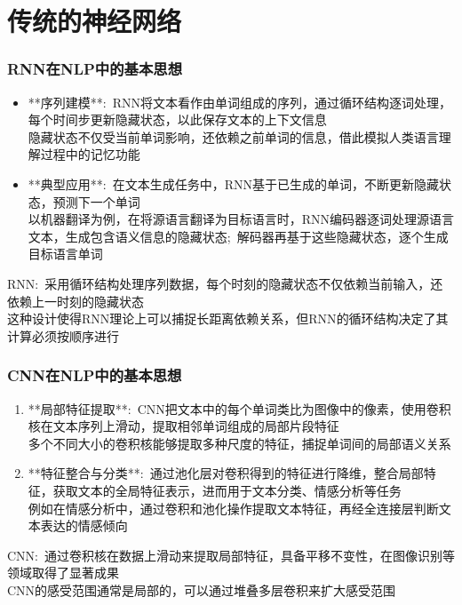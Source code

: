 \small
\section{传统的神经网络}
\begin{frame}
	\frametitle{\textrm{RNN}在\textrm{NLP}中的基本思想}
    \begin{itemize}
    \item **序列建模**:~\textrm{RNN}将文本看作由单词组成的序列，通过循环结构逐词处理，每个时间步更新隐藏状态，以此保存文本的上下文信息\\
	    隐藏状态不仅受当前单词影响，还依赖之前单词的信息，借此模拟人类语言理解过程中的记忆功能
    \item **典型应用**:~在文本生成任务中，\textrm{RNN}基于已生成的单词，不断更新隐藏状态，预测下一个单词\\
	    以机器翻译为例，在将源语言翻译为目标语言时，\textrm{RNN}编码器逐词处理源语言文本，生成包含语义信息的隐藏状态;~解码器再基于这些隐藏状态，逐个生成目标语言单词
    \end{itemize}
	    \textrm{RNN}:~采用循环结构处理序列数据，每个时刻的隐藏状态不仅依赖当前输入，还依赖上一时刻的隐藏状态\\
		    这种设计使得\textrm{RNN}理论上可以捕捉长距离依赖关系，但\textrm{RNN}的循环结构决定了其计算必须按顺序进行
\end{frame}

\begin{frame}
	\frametitle{\textrm{CNN}在\textrm{NLP}中的基本思想}
    \begin{enumerate}
	    \item **局部特征提取**:~\textrm{CNN}把文本中的每个单词类比为图像中的像素，使用卷积核在文本序列上滑动，提取相邻单词组成的局部片段特征\\
		    多个不同大小的卷积核能够提取多种尺度的特征，捕捉单词间的局部语义关系
        \item **特征整合与分类**:~通过池化层对卷积得到的特征进行降维，整合局部特征，获取文本的全局特征表示，进而用于文本分类、情感分析等任务\\
		例如在情感分析中，通过卷积和池化操作提取文本特征，再经全连接层判断文本表达的情感倾向
    \end{enumerate}
	    \textrm{CNN}:~通过卷积核在数据上滑动来提取局部特征，具备平移不变性，在图像识别等领域取得了显著成果\\
		    \textrm{CNN}的感受范围通常是局部的，可以通过堆叠多层卷积来扩大感受范围
\end{frame}

